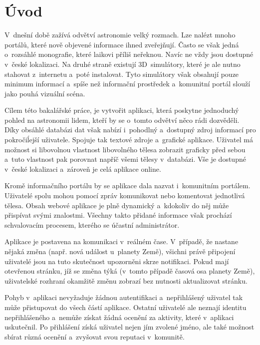 \documentclass[a4paper,12pt]{article}
\begin{document}

\clearpage
\pagestyle{plain}		%

 {}
\section*{Úvod}
\label{uvod}

V~dnešní době zažívá odvětví astronomie velký rozmach. Lze nalézt mnoho portálů, které nově objevené informace ihned zveřejňují. Často se však jedná o~rozsáhlé monografie, které laikovi příliš neřeknou. Navíc ne vždy jsou dostupné v~české lokalizaci. Na druhé straně existují 3D~simulátory, které je ale nutno stahovat z~internetu a~poté instalovat. Tyto simulátory však obsahují pouze minimum informací a~spíše než informační prostředek a~komunitní portál slouží jako pouhá vizuální scéna.

Cílem této bakalářské práce, je vytvořit aplikaci, která poskytne jednoduchý pohled na astronomii lidem, kteří by se o~tomto odvětví něco rádi dozvěděli. Díky obsáhlé databázi dat však nabízí i~pohodlný a~dostupný zdroj informací pro pokročiĺejší uživatele. Spojuje tak textové zdroje a~grafické aplikace. Uživatel má možnost si libovolnou vlastnost libovolného tělesa zobrazit graficky před sebou a~tuto vlastnost pak porovnat napříč všemi tělesy v~databázi. Vše je dostupné v~české lokalizaci a~zároveň je celá aplikace online.

Kromě informačního portálu by se aplikace dala nazvat i~komunitním portálem. Uživatelé spolu mohou pomocí zpráv komunikovat nebo komentovat jednotlivá tělesa. Obsah webové aplikace je plně dynamický a~kdokoliv do něj může přispívat svými znalostmi. Všechny takto přidané informace však prochází schvalovacím procesem, kterého se účastní administrátor.

Aplikace je postavena na komunikaci v~reálném čase. V~případě, že nastane nějaká změna (např. nová událost u~planety Země), všichni právě připojení uživatelé jsou na tuto skutečnost upozorněni skrze notifikaci. Pokud mají otevřenou stránku, jíž se změna týká (v~tomto případě časová osa planety Země), uživatelské rozhraní okamžitě změnu zobrazí bez nutnosti aktualizovat stránku.

Pohyb v~aplikaci nevyžaduje žádnou autentifikaci a~nepřihlášený uživatel tak může přistupovat do všech částí aplikace. Ostatní uživatelé ale neznají identitu nepřihlášeného a~nemůže získat žádná ocenění za aktivity, které v~aplikaci uskutečnil. Po přihlášení získá uživatel nejen jím zvolené jméno, ale také možnost sbírat různá ocenění a~zvyšovat svou reputaci v~komunitě.
\end{document}
